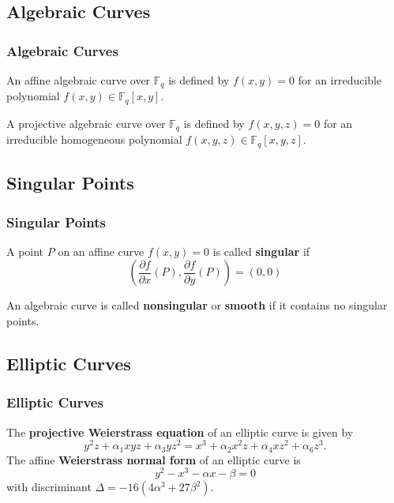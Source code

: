 \documentclass{beamer}
\begin{document}
    \subsection{Algebraic Curves}
    \begin{frame}
        \frametitle{Algebraic Curves}
        \begin{definition}
            An affine algebraic curve over \(\mathbb{F}_q\) is defined by
            \(f(x, y) = 0\) for an irreducible polynomial
            \(f(x, y) \in \mathbb{F}_q[x, y]\).
        \end{definition}
        \vfill
        \begin{definition}
            A projective algebraic curve over \(\mathbb{F}_q\) is defined by
            \(f(x, y, z) = 0\) for an irreducible homogeneous polynomial
            \(f(x, y, z) \in \mathbb{F}_q[x, y, z]\).
        \end{definition}
    \end{frame}

    \subsection{Singular Points}
    \begin{frame}
        \frametitle{Singular Points}
        \begin{definition}
            A point \(P\) on an affine curve \(f(x, y) = 0\) is called
            \textbf{singular} if
            \[\left(\frac{\partial f}{\partial x}(P),
                    \frac{\partial f}{\partial y}(P)\right) = (0, 0)\]
        \end{definition}
        \vfill
        \begin{definition}
            An algebraic curve is called \textbf{nonsingular} or
            \textbf{smooth} if it contains no singular points.
        \end{definition}
    \end{frame}

    \subsection{Elliptic Curves}
    \begin{frame}
        \frametitle{Elliptic Curves}
        The \textbf{projective Weierstrass equation} of an elliptic curve is
        given by
        \[y^2z + \alpha_1xyz + \alpha_3yz^2 =
          x^3 + \alpha_2x^2z + \alpha_4xz^2 + \alpha_6z^3.\]
        \vfill %
        The affine \textbf{Weierstrass normal form} of an elliptic curve is
        \[y^2 - x^3 - \alpha x - \beta = 0\] with
        discriminant \(\Delta = -16(4\alpha^3 + 27\beta^2)\).
    \end{frame}
\end{document}
